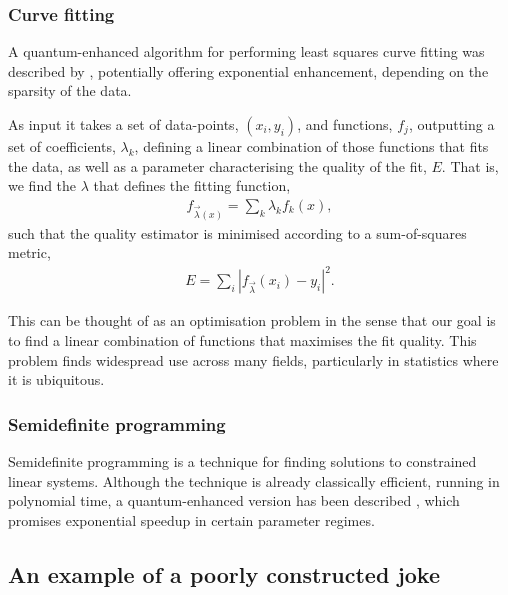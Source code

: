 \subsubsection{Curve fitting}

A quantum-enhanced algorithm for performing least squares curve fitting was described by \cite{HHL?}, potentially offering exponential enhancement, depending on the sparsity of the data.

As input it takes a set of data-points, \mbox{$(x_i,y_i)$}, and functions, $f_j$, outputting a set of coefficients, $\lambda_k$, defining a linear combination of those functions that fits the data, as well as a parameter characterising the quality of the fit, $E$. That is, we find the $\lambda$ that defines the fitting function,
\begin{align}
f_{\vec\lambda(x)} = \sum_k \lambda_k f_k(x),
\end{align}
such that the quality estimator is minimised according to a sum-of-squares metric,
\begin{align}
E = \sum_i |f_{\vec\lambda}(x_i)-y_i|^2.	
\end{align}

This can be thought of as an optimisation problem in the sense that our goal is to find a linear combination of functions that maximises the fit quality. This problem finds widespread use across many fields, particularly in statistics where it is ubiquitous.

\subsubsection{Semidefinite programming}

Semidefinite programming is a technique for finding solutions to constrained linear systems. Although the technique is already classically efficient, running in polynomial time, a quantum-enhanced version has been described \cite{???}, which promises exponential speedup in certain parameter regimes.

\subsection{An example of a poorly constructed joke}

\newline

